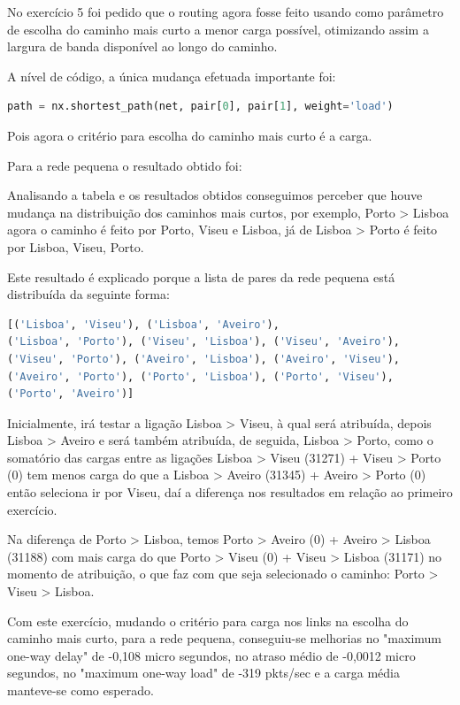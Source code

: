 \documentclass[pdftex,12pt,a4paper]{report}
\begin{document}
No exercício 5 foi pedido que o routing agora fosse feito usando como parâmetro de escolha do caminho mais curto a menor carga possível, otimizando assim a largura de banda disponível  ao longo do caminho.

A nível de código, a única mudança efetuada importante foi:
\begin{lstlisting}[language=python]
path = nx.shortest_path(net, pair[0], pair[1], weight='load')
\end{lstlisting}

Pois agora o critério para escolha do caminho mais curto é a carga.

Para a rede pequena o resultado obtido foi:



Analisando a tabela e os resultados obtidos conseguimos perceber que houve mudança na distribuição dos caminhos mais curtos, por exemplo, Porto > Lisboa agora o caminho é feito por Porto, Viseu e Lisboa, já de Lisboa > Porto é feito por Lisboa, Viseu, Porto.

Este resultado é explicado porque a lista de pares da rede pequena está distribuída da seguinte forma:

\begin{lstlisting}[language=python]
[('Lisboa', 'Viseu'), ('Lisboa', 'Aveiro'),
('Lisboa', 'Porto'), ('Viseu', 'Lisboa'), ('Viseu', 'Aveiro'),
('Viseu', 'Porto'), ('Aveiro', 'Lisboa'), ('Aveiro', 'Viseu'), 
('Aveiro', 'Porto'), ('Porto', 'Lisboa'), ('Porto', 'Viseu'),
('Porto', 'Aveiro')]
\end{lstlisting}

Inicialmente, irá testar a ligação Lisboa > Viseu, à qual será atribuída, depois Lisboa > Aveiro e será também atribuída, de seguida, Lisboa > Porto, como o somatório das cargas entre as ligações Lisboa > Viseu (31271) + Viseu > Porto (0) tem menos carga do que a Lisboa > Aveiro (31345) + Aveiro > Porto (0) então seleciona ir por Viseu, daí a diferença nos resultados em relação ao primeiro exercício.
 
Na diferença de Porto > Lisboa, temos Porto > Aveiro (0)  + Aveiro > Lisboa (31188) com mais carga do que Porto > Viseu (0) + Viseu > Lisboa (31171) no momento de atribuição, o que faz com que seja selecionado o caminho: Porto > Viseu > Lisboa.





Com este exercício, mudando o critério para carga nos links na escolha do caminho mais curto, para a rede pequena, conseguiu-se melhorias no "maximum one-way delay" de -0,108 micro segundos, no atraso médio de -0,0012 micro segundos, no "maximum one-way load" de -319 pkts/sec e a carga média manteve-se como esperado.
\end{document}
